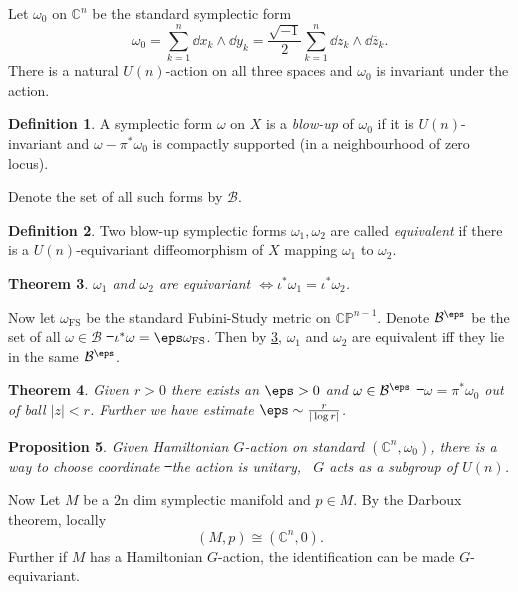 \documentclass[12pt]{article}
\theoremstyle{plain}\newtheorem{theorem}{Theorem}
\theoremstyle{definition}\newtheorem{definition}[theorem]{Definition}
\theoremstyle{definition}\newtheorem{example}[theorem]{Example}
\theoremstyle{plain}\newtheorem{axiom}[theorem]{Axiom}
\theoremstyle{plain}\newtheorem{assertion}[theorem]{Assertion}
\theoremstyle{plain}\newtheorem{corollary}[theorem]{Corollary}
\theoremstyle{plain}\newtheorem{lemma}[theorem]{Lemma}
\theoremstyle{plain}\newtheorem{proposition}[theorem]{Proposition}
\theoremstyle{plain}\newtheorem{prop}[theorem]{Proposition}
\theoremstyle{plain}\newtheorem{conjecture}[theorem]{Conjecture}
\theoremstyle{plain}\newtheorem{conj}[theorem]{Conjecture}
\theoremstyle{plain}\newtheorem{problem}[theorem]{Problem}
\theoremstyle{remark}\newtheorem{notation}[theorem]{Notation}
\theoremstyle{definition}\newtheorem*{question}{Question}
\theoremstyle{definition}\newtheorem*{answer}{Answer}
\theoremstyle{definition}\newtheorem*{goal}{Goal}
\theoremstyle{plain}\newtheorem*{application}{Application}
\theoremstyle{plain}\newtheorem*{exercise}{Exercise}
\theoremstyle{remark}\newtheorem*{remark}{Remark}
\theoremstyle{remark}\newtheorem*{note}{\small{Note}}
\numberwithin{equation}{section}
\numberwithin{theorem}{section}
\numberwithin{figure}{section}
\begin{document}
Let \(\omega_0\) on \(\mathbb{C}^n\) be the standard symplectic form \[
    \omega_0=\sum_{k=1}^{n}\dd{x_k}\wedge \dd{y_k}
    =\frac{\sqrt{-1}}{2}\sum_{k=1}^n \dd{z_k}\wedge \dd{\overline{z}_k}
.\] There is a natural \(U(n)\)-action on all three spaces and \(\omega_0\) is
invariant under the action.

\begin{definition}
    A symplectic form \(\omega\) on \(X\) is a \emph{blow-up} of \(\omega_0\) if
    it is \(U(n)\)-invariant and \(\omega-\pi^*\omega_0\) is compactly supported
    (in a neighbourhood of zero locus).
\end{definition}
Denote the set of all such forms by \(\mathcal{B}\).

\begin{definition}
    Two blow-up symplectic forms \(\omega_1,\omega_2\) are called \emph{equivalent}
    if there is a \(U(n)\)-equivariant diffeomorphism of \(X\) mapping \(\omega_1\) to
    \(\omega_2\).
\end{definition}

\begin{theorem}\label{thm:equiv-blow-up}
    \(\omega_1\) and \(\omega_2\) are equivariant \(\iff \iota^* \omega_1
    =\iota^* \omega_2\).
\end{theorem}

Now let \(\omega_{\text{FS}}\) be the standard Fubini-Study metric on
\(\mathbb{CP}^{n-1}\). Denote \(\mathcal{B}^{\eps}\) be the set of all \(\omega\in
\mathcal{B}\) \st\ \(\iota^* \omega=\eps \omega_{\text{FS}}\). Then by
\cref{thm:equiv-blow-up}, \(\omega_1\) and \(\omega_2\) are equivalent iff they lie
in the same \(\mathcal{B}^{\eps}\).

\begin{theorem}
    Given \(r>0\) there exists an \(\eps>0\) and \(\omega\in \mathcal{B}^{\eps}\) \st\ 
    \(\omega=\pi^*\omega_0\) out of ball \(|z|<r\). Further we have estimate
    \(\eps\sim \frac{r}{|\log r|}\).
\end{theorem}

\begin{prop}
    Given Hamiltonian \(G\)-action on standard \((\mathbb{C}^n,\omega_0)\), there is
    a way to choose coordinate \st\ the action is unitary, \ie\ \(G\) acts as a
    subgroup of \(U(n)\).
\end{prop}
Now Let \(M\) be a 2n dim symplectic manifold and \(p\in M\). By the Darboux theorem,
locally \[
    (M,p)\cong (\mathbb{C}^n,0)
.\] Further if \(M\) has a Hamiltonian \(G\)-action, the identification can be made
\(G\)-equivariant.
\end{document}

